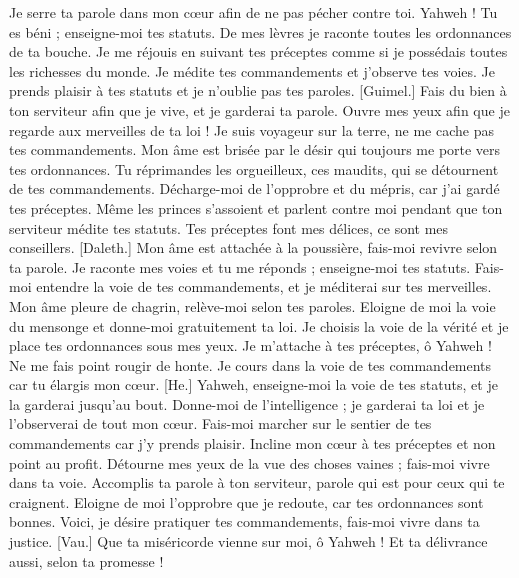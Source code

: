 \begin{multicols}{2}
Je serre ta parole dans mon cœur afin de ne pas pécher contre toi.
Yahweh ! Tu es béni ; enseigne-moi tes statuts.
De mes lèvres je raconte toutes les ordonnances de ta bouche.
Je me réjouis en suivant tes préceptes comme si je possédais toutes les richesses du monde.
Je médite tes commandements et j’observe tes voies.
Je prends plaisir à tes statuts et je n'oublie pas tes paroles.
[Guimel.] Fais du bien à ton serviteur afin que je vive, et je garderai ta parole.
Ouvre mes yeux afin que je regarde aux merveilles de ta loi !
Je suis voyageur sur la terre, ne me cache pas tes commandements.
Mon âme est brisée par le désir qui toujours me porte vers tes ordonnances.
Tu réprimandes les orgueilleux, ces maudits, qui se détournent de tes commandements.
Décharge-moi de l'opprobre et du mépris, car j'ai gardé tes préceptes.
Même les princes s’assoient et parlent contre moi pendant que ton serviteur médite tes statuts.
Tes préceptes font mes délices, ce sont mes conseillers.
[Daleth.] Mon âme est attachée à la poussière, fais-moi revivre selon ta parole.
Je raconte mes voies et tu me réponds ; enseigne-moi tes statuts.
Fais-moi entendre la voie de tes commandements, et je méditerai sur tes merveilles.
Mon âme pleure de chagrin, relève-moi selon tes paroles.
Eloigne de moi la voie du mensonge et donne-moi gratuitement ta loi.
Je choisis la voie de la vérité et je place tes ordonnances sous mes yeux.
Je m’attache à tes préceptes, ô Yahweh ! Ne me fais point rougir de honte.
Je cours dans la voie de tes commandements car tu élargis mon cœur.
[He.] Yahweh, enseigne-moi la voie de tes statuts, et je la garderai jusqu’au bout.
Donne-moi de l'intelligence ; je garderai ta loi et je l'observerai de tout mon cœur.
Fais-moi marcher sur le sentier de tes commandements car j'y prends plaisir.
Incline mon cœur à tes préceptes et non point au profit.
Détourne mes yeux de la vue des choses vaines ; fais-moi vivre dans ta voie.
Accomplis ta parole à ton serviteur, parole qui est pour ceux qui te craignent.
Eloigne de moi l’opprobre que je redoute, car tes ordonnances sont bonnes.
Voici, je désire pratiquer tes commandements, fais-moi vivre dans ta justice.
[Vau.] Que ta miséricorde vienne sur moi, ô Yahweh ! Et ta délivrance aussi, selon ta promesse !

\end{multicols}
